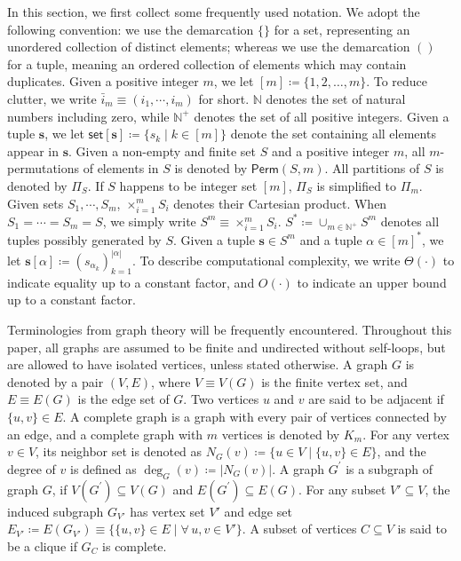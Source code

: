 \documentclass[twoside,11pt]{article}
\newcommand{\takesetp}[1]{\mathsf{set}[#1]}
\newcommand{\perm}[1]{\mathsf{Perm}(#1)}
\newcommand{\partition}{\Pi}
\newcommand{\partitionp}[1]{\partition_{#1}}
\newcommand{\degp}[2]{\deg_{#2}(#1)}
\newcommand{\completegraphp}[1]{K_{#1}}
\newcommand{\less}{O}
\newcommand{\appequal}{\Theta}
\newcommand{\naturals}{\mathbb{N}}
\newcommand{\positivenaturals}{\mathbb{N}^+}
\begin{document}
In this section, we first collect some frequently used notation. We adopt the following convention: we use the demarcation $\{\}$ for a set, representing an unordered collection of distinct elements; whereas we use the demarcation $()$ for a tuple, meaning an ordered collection of elements which may contain duplicates. Given a positive integer $m$, we let $[m] \coloneqq \{1, 2, \ldots, m\}$. To reduce clutter, we write $\bar{i}_{m} \equiv (i_{1}, \cdots, i_{m})$ for short. $\naturals$ denotes the set of natural numbers including zero, while $\positivenaturals$ denotes the set of all positive integers. Given a tuple $\bm{s}$, we let $\takesetp{\bm{s}} \coloneqq \{s_k \mid k\in [m]\}$ denote the set containing all elements appear in $\bm{s}$. Given a non-empty and finite set $S$ and a positive integer $m$, all $m$-permutations of elements in $S$ is denoted by $\perm{S, m}$. All partitions of $S$ is denoted by $\partitionp{S}$. If $S$ happens to be integer set $[m]$, $\partitionp{S}$ is simplified to $\partitionp{m}$. Given sets $S_{1}, \cdots, S_{m}$, $\times_{i = 1}^{m} S_{i}$ denotes their Cartesian product. When $S_{1} = \cdots = S_{m} = S$, we simply write $S^{m} \equiv \times_{i = 1}^{m} S_{i}$. $S^* \coloneqq \cup_{m \in \positivenaturals} S^m$ denotes all tuples possibly generated by $S$. Given a tuple $\bm{s} \in S^m$ and a tuple $\alpha \in [m]^*$, we let $\bm{s}[\alpha] \coloneqq (s_
{\alpha_k})_{k=1}^{|\alpha|}$. To describe computational complexity, we write $\appequal(\cdot)$ to indicate equality up to a constant factor, and $\less(\cdot)$ to indicate an upper bound up to a constant factor.


Terminologies from graph theory will be frequently encountered. Throughout this paper, all graphs are assumed to be finite and undirected without self-loops, but are allowed to have isolated vertices, unless stated otherwise. A graph $G$ is denoted by a pair $(V, E)$, where $V \equiv V (G)$ is the finite vertex set, and $E \equiv E (G)$ is the edge set of $G$. Two vertices $u$ and $v$ are said to be adjacent if $\{u, v\} \in E$. A complete graph is a graph with every pair of vertices connected by an edge, and a complete graph with $m$ vertices is denoted by $\completegraphp{m}$. For any vertex $v \in V$, its neighbor set is denoted as $N_G (v) \coloneqq \{ u \in V \mid \{u, v\} \in E \}$, and the degree of $v$ is defined as $\degp{v}{G} \coloneqq |N_G(v)|$. A graph $G^\prime$ is a subgraph of graph $G$, if $V (G^\prime) \subseteq V (G)$ and $E (G^\prime) \subseteq E (G)$. For any subset $V' \subseteq V$, the induced subgraph $G_{V'}$ has vertex set $V'$ and edge set $E_{V'} \coloneqq E (G_{V'}) \equiv \{\{u, v\} \in E \mid \forall \, u, v \in V'\}$. A subset of vertices $C \subseteq V$ is said to be a clique if $G_{C}$ is complete.
\end{document}
